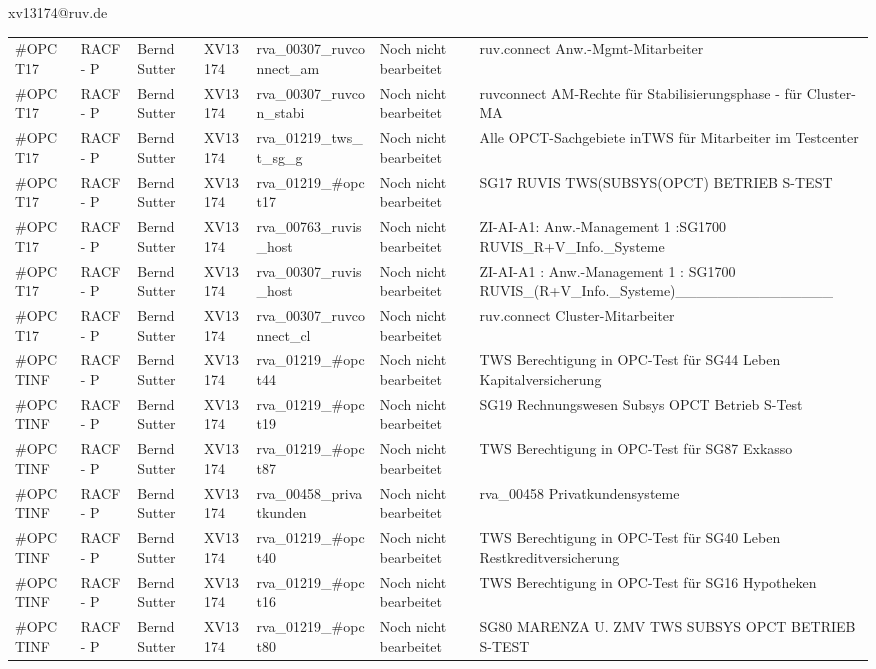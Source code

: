 \documentclass[a4paper,landscape,12pt]{letter}
\begin{document}
\begin{letter}{xv13174@ruv.de\hfill \break}
\begin{tiny}
\begin{longtable}{|p{35mm}|p{15mm}|p{25mm}|p{10mm}|p{40mm}|p{50mm}|p{50mm}|}
\#OPCT17 & RACF - P & Bernd Sutter & XV13174 & rva\_00307\_ruvconnect\_am & Noch nicht bearbeitet & ruv.connect Anw.-Mgmt-Mitarbeiter \\
\#OPCT17 & RACF - P & Bernd Sutter & XV13174 & rva\_00307\_ruvcon\_stabi & Noch nicht bearbeitet & ruvconnect AM-Rechte für Stabilisierungsphase - für Cluster-MA \\
\#OPCT17 & RACF - P & Bernd Sutter & XV13174 & rva\_01219\_tws\_t\_sg\_g & Noch nicht bearbeitet & Alle OPCT-Sachgebiete inTWS für Mitarbeiter im Testcenter \\
\#OPCT17 & RACF - P & Bernd Sutter & XV13174 & rva\_01219\_\#opct17 & Noch nicht bearbeitet & SG17 RUVIS TWS(SUBSYS(OPCT) BETRIEB S-TEST \\
\#OPCT17 & RACF - P & Bernd Sutter & XV13174 & rva\_00763\_ruvis\_host & Noch nicht bearbeitet & ZI-AI-A1: Anw.-Management 1 :SG1700 RUVIS\_R+V\_Info.\_Systeme \\
\#OPCT17 & RACF - P & Bernd Sutter & XV13174 & rva\_00307\_ruvis\_host & Noch nicht bearbeitet & ZI-AI-A1   : Anw.-Management 1 : SG1700 RUVIS\_(R+V\_Info.\_Systeme)\_\_\_\_\_\_\_\_\_\_\_\_\_\_\_ \\
\#OPCT17 & RACF - P & Bernd Sutter & XV13174 & rva\_00307\_ruvconnect\_cl & Noch nicht bearbeitet & ruv.connect Cluster-Mitarbeiter \\
\#OPCTINF & RACF - P & Bernd Sutter & XV13174 & rva\_01219\_\#opct44 & Noch nicht bearbeitet & TWS Berechtigung in OPC-Test für SG44 Leben Kapitalversicherung \\
\#OPCTINF & RACF - P & Bernd Sutter & XV13174 & rva\_01219\_\#opct19 & Noch nicht bearbeitet & SG19 Rechnungswesen Subsys OPCT Betrieb S-Test \\
\#OPCTINF & RACF - P & Bernd Sutter & XV13174 & rva\_01219\_\#opct87 & Noch nicht bearbeitet & TWS Berechtigung in OPC-Test für SG87 Exkasso \\
\#OPCTINF & RACF - P & Bernd Sutter & XV13174 & rva\_00458\_privatkunden & Noch nicht bearbeitet & rva\_00458 Privatkundensysteme \\
\#OPCTINF & RACF - P & Bernd Sutter & XV13174 & rva\_01219\_\#opct40 & Noch nicht bearbeitet & TWS Berechtigung in OPC-Test für SG40 Leben Restkreditversicherung \\
\#OPCTINF & RACF - P & Bernd Sutter & XV13174 & rva\_01219\_\#opct16 & Noch nicht bearbeitet & TWS Berechtigung in OPC-Test für SG16 Hypotheken \\
\#OPCTINF & RACF - P & Bernd Sutter & XV13174 & rva\_01219\_\#opct80 & Noch nicht bearbeitet & SG80 MARENZA U. ZMV TWS SUBSYS OPCT BETRIEB S-TEST \\

\end{longtable}
\end{tiny}
\end{letter}
\end{document}
